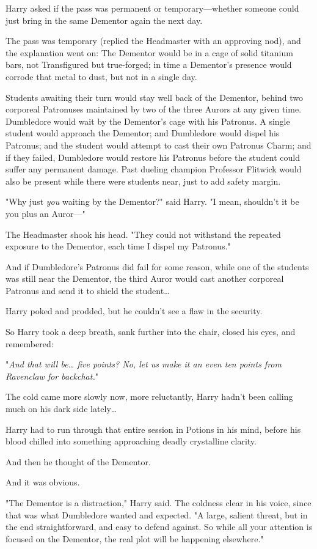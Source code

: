 Harry asked if the pass was permanent or temporary---whether someone could just 
bring in the same Dementor again the next day.

The pass was temporary (replied the Headmaster with an approving nod), and the 
explanation went on: The Dementor would be in a cage of solid titanium bars, 
not Transfigured but true-forged; in time a Dementor's presence would corrode 
that metal to dust, but not in a single day.

Students awaiting their turn would stay well back of the Dementor, behind two 
corporeal Patronuses maintained by two of the three Aurors at any given time. 
Dumbledore would wait by the Dementor's cage with his Patronus. A single 
student would approach the Dementor; and Dumbledore would dispel his Patronus; 
and the student would attempt to cast their own Patronus Charm; and if they 
failed, Dumbledore would restore his Patronus before the student could suffer 
any permanent damage. Past dueling champion Professor Flitwick would also be 
present while there were students near, just to add safety margin.

"Why just \emph{you} waiting by the Dementor?" said Harry. "I mean, shouldn't 
it be you plus an Auror---"

The Headmaster shook his head. "They could not withstand the repeated exposure 
to the Dementor, each time I dispel my Patronus."

And if Dumbledore's Patronus did fail for some reason, while one of the 
students was still near the Dementor, the third Auror would cast another 
corporeal Patronus and send it to shield the student{\ldots}

Harry poked and prodded, but he couldn't see a flaw in the security.

So Harry took a deep breath, sank further into the chair, closed his eyes, and 
remembered:

"\emph{And that will be{\ldots} five points? No, let us make it an even ten 
points from Ravenclaw for backchat.}"

The cold came more slowly now, more reluctantly, Harry hadn't been calling much 
on his dark side lately{\ldots}

Harry had to run through that entire session in Potions in his mind, before his 
blood chilled into something approaching deadly crystalline clarity.

And then he thought of the Dementor.

And it was obvious.

"The Dementor is a distraction," Harry said. The coldness clear in his voice, 
since that was what Dumbledore wanted and expected. "A large, salient threat, 
but in the end straightforward, and easy to defend against. So while all your 
attention is focused on the Dementor, the real plot will be happening 
elsewhere."

